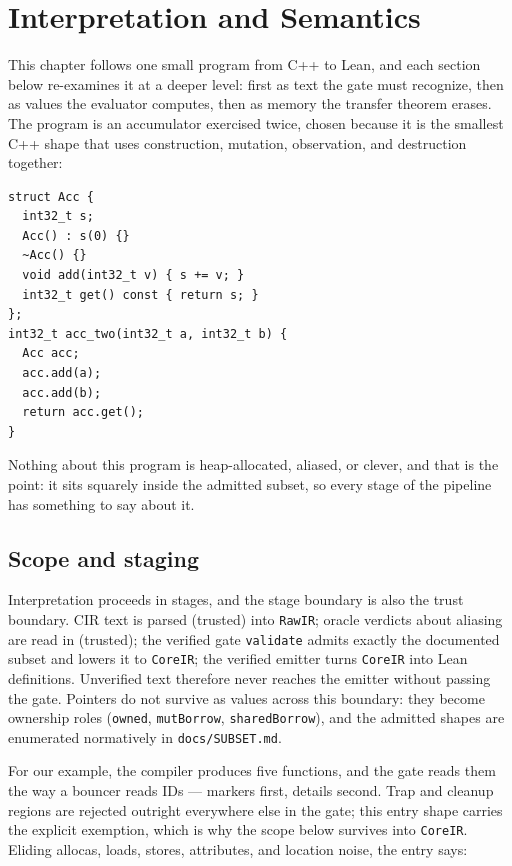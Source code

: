 \chapter{Interpretation and Semantics}
\label{ch:semantics}

This chapter follows one small program from C++ to Lean, and each
section below re-examines it at a deeper level: first as text the gate
must recognize, then as values the evaluator computes, then as memory
the transfer theorem erases. The program is an accumulator exercised
twice, chosen because it is the smallest C++ shape that uses
construction, mutation, observation, and destruction together:

\begin{verbatim}
struct Acc {
  int32_t s;
  Acc() : s(0) {}
  ~Acc() {}
  void add(int32_t v) { s += v; }
  int32_t get() const { return s; }
};
int32_t acc_two(int32_t a, int32_t b) {
  Acc acc;
  acc.add(a);
  acc.add(b);
  return acc.get();
}
\end{verbatim}

Nothing about this program is heap-allocated, aliased, or clever, and
that is the point: it sits squarely inside the admitted subset, so
every stage of the pipeline has something to say about it.

\section{Scope and staging}

Interpretation proceeds in stages, and the stage boundary is also the
trust boundary. CIR text is parsed (trusted) into \texttt{RawIR}; oracle
verdicts about aliasing are read in (trusted); the verified gate
\texttt{validate} admits exactly the documented subset and lowers it to
\texttt{CoreIR}; the verified emitter turns \texttt{CoreIR} into Lean
definitions. Unverified text therefore never reaches the emitter without
passing the gate. Pointers do not survive as values across this boundary:
they become ownership roles (\texttt{owned}, \texttt{mutBorrow},
\texttt{sharedBorrow}), and the admitted shapes are enumerated normatively
in \texttt{docs/SUBSET.md}.

For our example, the compiler produces five functions, and the gate
reads them the way a bouncer reads IDs --- markers first, details
second. Trap and cleanup regions are rejected outright everywhere else
in the gate; this entry shape carries the explicit exemption, which is
why the scope below survives into \texttt{CoreIR}. Eliding allocas,
loads, stores, attributes, and location noise, the entry says:

